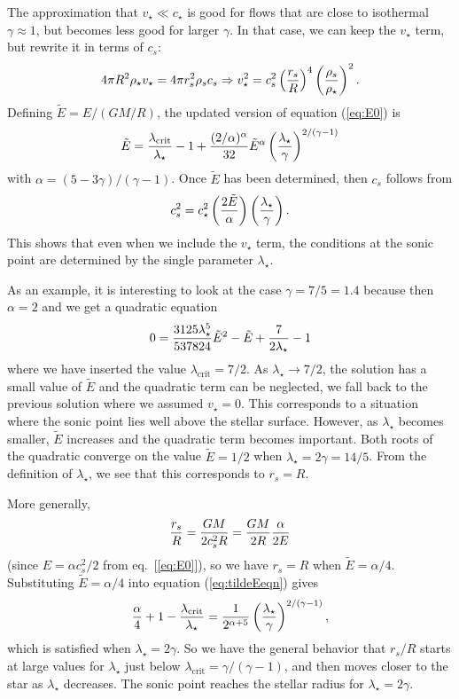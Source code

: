 \documentclass[preprint,12pt]{aastex}
\begin{document}
The approximation that $v_\star\ll c_\star$ is good for flows that are close to isothermal $\gamma\approx 1$, but becomes less good for larger $\gamma$. In that case, we can keep the $v_\star$ term, but rewrite it in terms of $c_s$:
\begin{equation}
4\pi R^2\rho_\star v_\star = 4\pi r_s^2 \rho_s c_s\Rightarrow v_\star^2 = c_s^2 \left({r_s\over R}\right)^4\left({\rho_s\over \rho_\star}\right)^2.
\end{equation}
Defining $\tilde{E} = E/ (GM/R)$, the updated version of equation (\ref{eq:E0}) is
\begin{equation}\label{eq:tildeEeqn}
\tilde{E} = {\lambda_\mathrm{crit}\over \lambda_\star}-1 + {(2/\alpha)^\alpha\over 32}\tilde{E}^\alpha \left({\lambda_\star\over \gamma}\right)^{2/(\gamma-1)}
\end{equation}
with $\alpha = (5-3\gamma)/(\gamma-1)$. Once $\tilde{E}$ has been determined, then $c_s$ follows from
\begin{equation}\label{eq:cseqn}
c_s^2 = c_\star^2 \left({2\tilde{E}\over \alpha}\right)\left({\lambda_\star\over\gamma}\right).
\end{equation}
This shows that even when we include the $v_\star$ term, the conditions at the sonic point are determined by the single parameter $\lambda_\star$. 

As an example, it is interesting to look at the case $\gamma=7/5=1.4$ because then $\alpha=2$ and we get a quadratic equation
\begin{equation}
0 = {3125\lambda_\star^5\over 537824}\tilde{E}^2 -\tilde{E} + {7\over 2\lambda_\star}-1
\end{equation}
where we have inserted the value $\lambda_\mathrm{crit}=7/2$. As $\lambda_\star\rightarrow 7/2$, the solution has a small value of $\tilde{E}$ and the quadratic term can be neglected, we fall back to the previous solution where we assumed $v_\star=0$. This corresponds to a situation where the sonic point lies well above the stellar surface. However, as $\lambda_\star$ becomes smaller, $\tilde{E}$ increases and the quadratic term becomes important. Both roots of the quadratic converge on the value $\tilde{E}=1/2$ when $\lambda_\star = 2\gamma = 14/5$. From the definition of $\lambda_\star$, we see that this corresponds to $r_s=R$. 

More generally, 
\begin{equation}
{r_s\over R} = {GM\over 2c_s^2R} = {GM\over 2R} {\alpha\over 2E}
\end{equation}
(since $E = \alpha c_s^2/2$ from eq.~[\ref{eq:E0}]), so we have $r_s=R$ when $\tilde{E} = \alpha/4$. Substituting $\tilde{E}=\alpha/4$ into equation (\ref{eq:tildeEeqn}) gives
\begin{equation}
{\alpha\over 4} + 1 - {\lambda_\mathrm{crit}\over \lambda_\star} = {1\over 2^{\alpha+5}} \left({\lambda_\star\over \gamma}\right)^{2/(\gamma-1)},
\end{equation}
which is satisfied when $\lambda_\star = 2\gamma$. So we have the general behavior that $r_s/R$ starts at large values for $\lambda_\star$ just below $\lambda_\mathrm{crit}=\gamma/(\gamma-1)$, and then moves closer to the star as $\lambda_\star$ decreases. The sonic point reaches the stellar radius for $\lambda_\star=2\gamma$. 
\end{document}
